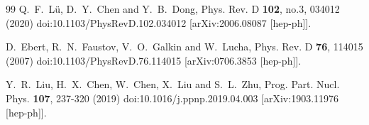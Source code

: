 \documentclass[prd,twocolumn,floatfix,nofootinbib]{revtex4}
\begin{document}
\begin{thebibliography}{99}
    Q.~F.~L\"u, D.~Y.~Chen and Y.~B.~Dong,
    Phys. Rev. D \textbf{102}, no.3, 034012 (2020)
    doi:10.1103/PhysRevD.102.034012
    [arXiv:2006.08087 [hep-ph]].

    D.~Ebert, R.~N.~Faustov, V.~O.~Galkin and W.~Lucha,
    Phys. Rev. D \textbf{76}, 114015 (2007)
    doi:10.1103/PhysRevD.76.114015
    [arXiv:0706.3853 [hep-ph]].

    Y.~R.~Liu, H.~X.~Chen, W.~Chen, X.~Liu and S.~L.~Zhu,
    Prog. Part. Nucl. Phys. \textbf{107}, 237-320 (2019)
    doi:10.1016/j.ppnp.2019.04.003
    [arXiv:1903.11976 [hep-ph]].

\end{thebibliography}
\end{document}
